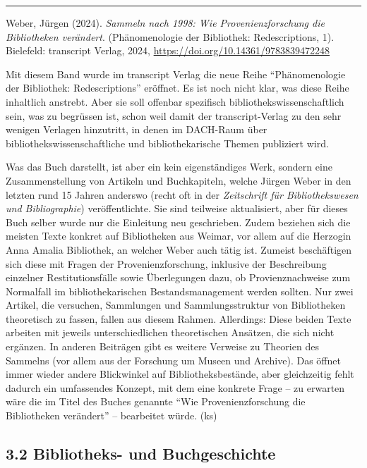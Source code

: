 \documentclass[a4paper,
fontsize=11pt,
oneside,
numbers=noperiodatend,
parskip=half-,
bibliography=totoc,
final
]{scrartcl}
\begin{document}
\begin{center}\rule{0.5\linewidth}{0.5pt}\end{center}

Weber, Jürgen (2024). \emph{Sammeln nach 1998: Wie Provenienzforschung
die Bibliotheken verändert}. (Phänomenologie der Bibliothek:
Redescriptions, 1). Bielefeld: transcript Verlag, 2024,
\url{https://doi.org/10.14361/9783839472248}

Mit diesem Band wurde im transcript Verlag die neue Reihe
``Phänomenologie der Bibliothek: Redescriptions'' eröffnet. Es ist noch
nicht klar, was diese Reihe inhaltlich anstrebt. Aber sie soll offenbar
spezifisch bibliothekswissenschaftlich sein, was zu begrüssen ist, schon
weil damit der transcript-Verlag zu den sehr wenigen Verlagen
hinzutritt, in denen im DACH-Raum über bibliothekswissenschaftliche und
bibliothekarische Themen publiziert wird.

Was das Buch darstellt, ist aber ein kein eigenständiges Werk, sondern
eine Zusammenstellung von Artikeln und Buchkapiteln, welche Jürgen Weber
in den letzten rund 15 Jahren anderswo (recht oft in der
\emph{Zeitschrift für Bibliothekswesen und Bibliographie})
veröffentlichte. Sie sind teilweise aktualisiert, aber für dieses Buch
selber wurde nur die Einleitung neu geschrieben. Zudem beziehen sich die
meisten Texte konkret auf Bibliotheken aus Weimar, vor allem auf die
Herzogin Anna Amalia Bibliothek, an welcher Weber auch tätig ist.
Zumeist beschäftigen sich diese mit Fragen der Provenienzforschung,
inklusive der Beschreibung einzelner Restitutionsfälle sowie
Überlegungen dazu, ob Provienznachweise zum Normalfall im
bibliothekarischen Bestandsmanagement werden sollten. Nur zwei Artikel,
die versuchen, Sammlungen und Sammlungsstruktur von Bibliotheken
theoretisch zu fassen, fallen aus diesem Rahmen. Allerdings: Diese
beiden Texte arbeiten mit jeweils unterschiedlichen theoretischen
Ansätzen, die sich nicht ergänzen. In anderen Beiträgen gibt es weitere
Verweise zu Theorien des Sammelns (vor allem aus der Forschung um Museen
und Archive). Das öffnet immer wieder andere Blickwinkel auf
Bibliotheksbestände, aber gleichzeitig fehlt dadurch ein umfassendes
Konzept, mit dem eine konkrete Frage -- zu erwarten wäre die im Titel
des Buches genannte ``Wie Provenienzforschung die Bibliotheken
verändert'' -- bearbeitet würde. (ks)

\subsection{3.2 Bibliotheks- und
Buchgeschichte}\label{bibliotheks--und-buchgeschichte}
\end{document}
